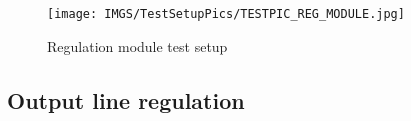 \begin{figure}[H]
	\centering
	\texttt{[image: IMGS/TestSetupPics/TESTPIC\_REG\_MODULE.jpg]}
	\caption{Regulation module test setup}
	\label{fig:arch}
\end{figure}
\subsection{Output line regulation}

